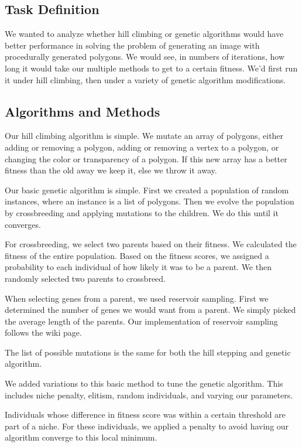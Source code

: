 \documentclass[12pt,letterpaper]{article}
\begin{document}
\subsection{Task Definition}
We wanted to analyze whether hill climbing or genetic algorithms would have better performance in solving the problem of generating an image with procedurally generated polygons. We would see, in numbers of iterations, how long it would take our multiple methods to get to a certain fitness. We'd first run it under hill climbing, then under a variety of genetic algorithm modifications.

\subsection{Algorithms and Methods}
Our hill climbing algorithm is simple. We mutate an array of polygons, either adding or removing a polygon, adding or removing a vertex to a polygon, or changing the color or transparency of a polygon. If this new array has a better fitness than the old away we keep it, else we throw it away.

Our basic genetic algorithm is simple. First we created a population of random instances, where an instance is a list of polygons.  Then we evolve the population by crossbreeding and applying mutations to the children.  We do this until it converges.

For crossbreeding, we select two parents based on their fitness.  We calculated the fitness of the entire population.  Based on the fitness scores, we assigned a probability to each individual of how likely it was to be a parent.  We then randomly selected two parents to crossbreed.

When selecting genes from a parent, we used reservoir sampling.  First we determined the number of genes we would want from a parent.  We simply picked the average length of the parents.  Our implementation of reservoir sampling follows the wiki page.

The list of possible mutations is the same for both the hill stepping and genetic algorithm.

We added variations to this basic method to tune the genetic algorithm. This includes niche penalty, elitism, random individuals, and varying our parameters.

Individuals whose difference in fitness score was within a certain threshold are part of a niche.  For these individuals, we applied a penalty to avoid having our algorithm converge to this local minimum.
\end{document}
